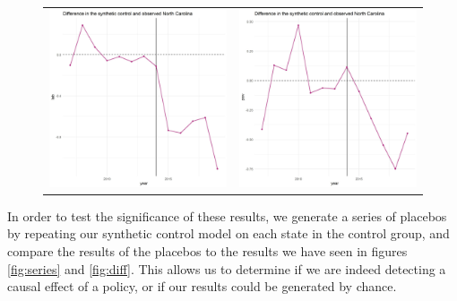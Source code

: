 \documentclass{article}
\begin{document}
\begin{figure}
\begin{center}
\begin{tabular}{cc}
 \includegraphics[width=80mm]{nc_lab_diff} &   \includegraphics[width=80mm]{nc_pov_diff} \\
\end{tabular}
\end{center}
\end{figure}

\restoregeometry

In order to test the significance of these results, we generate a series of placebos by repeating our synthetic control model on each state in the control group, and compare the results of the placebos to the results we have seen in figures \ref{fig:series} and \ref{fig:diff}. This allows us to determine if we are indeed detecting a causal effect of a policy, or if our results could be generated by chance. 
\end{document}
